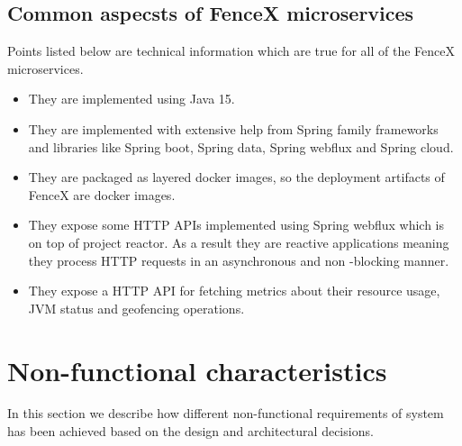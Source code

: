 \documentclass[a4]{report}
\begin{document}
    \subsection{Common aspecsts of FenceX microservices}
    Points listed below are technical information which are true for all of the FenceX microservices.

    \begin{itemize}
        \item They are implemented using Java 15.
        \item They are implemented with extensive help from Spring family frameworks and libraries like Spring boot,
        Spring data, Spring webflux and Spring cloud.
        \item They are packaged as layered docker images, so the deployment artifacts of FenceX are docker images.
        \item They expose some HTTP APIs implemented using Spring webflux which is on top of project reactor.
        As a result they are reactive applications meaning they process HTTP requests in an asynchronous and non
        -blocking manner.
        \item They expose a HTTP API for fetching metrics about their resource usage, JVM status and geofencing
        operations.
    \end{itemize}


    \section{Non-functional characteristics}
    In this section we describe how different non-functional requirements of system has been achieved based on the
    design and architectural decisions.
\end{document}
